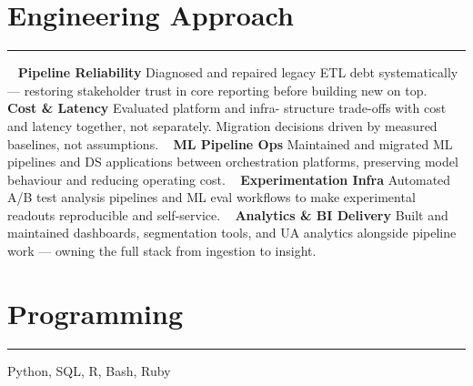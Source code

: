 %
%

\vspace{-1.0cm}
\section{\LARGE Engineering Approach}
\noindent\rule{\textwidth}{0.4pt}
\vspace{-0.2cm}
~
\textbf{\large Pipeline Reliability}
\faGem Diagnosed and repaired legacy ETL debt systematically — restoring stakeholder trust in core reporting before building new on top.
~
\textbf{\large Cost \& Latency}
\faGem Evaluated platform and infra- structure trade-offs with cost and latency together, not separately. Migration decisions driven by measured baselines, not assumptions.
~
\textbf{\large ML Pipeline Ops}
\faGem Maintained and migrated ML pipelines and DS applications between orchestration platforms, preserving model behaviour and reducing operating cost.
~
\textbf{\large Experimentation Infra}
\faGem Automated A/B test analysis pipelines and ML eval workflows to make experimental readouts reproducible and self-service.
~
\textbf{\large Analytics \& BI Delivery}
\faGem Built and maintained dashboards, segmentation tools, and UA analytics alongside pipeline work — owning the full stack from ingestion to insight.
\section{\LARGE Programming}
\noindent\rule{\textwidth}{0.4pt}
Python, SQL, R, Bash, Ruby
